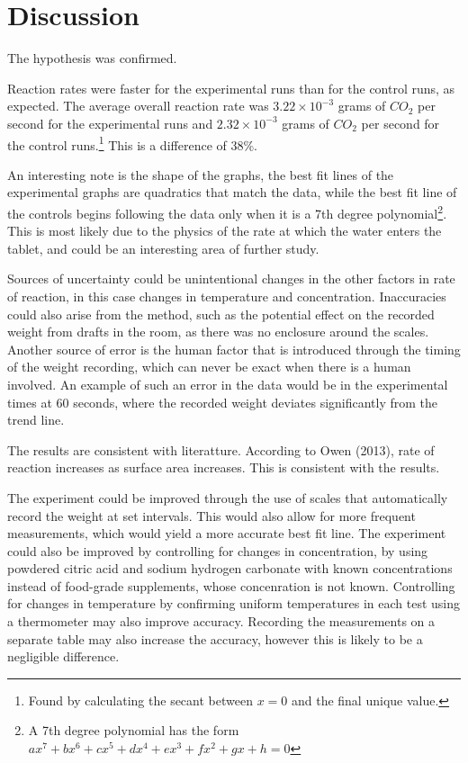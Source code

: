 \documentclass[twoside]{article}
\begin{document}
\section*{Discussion}
	The hypothesis was confirmed.

	Reaction rates were faster for the experimental runs than for the control runs, as expected. The average overall reaction rate was $3.22 \times 10^{-3}$ grams of $CO_2$ per second for the experimental runs and $2.32 \times 10^{-3}$ grams of $CO_2$ per second for the control runs.\footnote{Found by calculating the secant between $x=0$ and the final unique value.} This is a difference of 38\%.
	
	An interesting note is the shape of the graphs, the best fit lines of the experimental graphs are quadratics that match the data, while the best fit line of the controls begins following the data only when it is a 7th degree polynomial\footnote{A 7th degree polynomial has the form $ax^{7}+bx^{6}+cx^{5}+dx^{4}+ex^{3}+fx^{2}+gx+h=0$}. This is most likely due to the physics of the rate at which the water enters the tablet, and could be an interesting area of further study.

	Sources of uncertainty could be unintentional changes in the other factors in rate of reaction, in this case changes in temperature and concentration. Inaccuracies could also arise from the method, such as the potential effect on the recorded weight from drafts in the room, as there was no enclosure around the scales. Another source of error is the human factor that is introduced through the timing of the weight recording, which can never be exact when there is a human involved. An example of such an error in the data would be in the experimental times at 60 seconds, where the recorded weight deviates significantly from the trend line.

	The results are consistent with literatture. According to Owen (2013), rate of reaction increases as surface area increases. This is consistent with the results.

	The experiment could be improved through the use of scales that automatically record the weight at set intervals. This would also allow for more frequent measurements, which would yield a more accurate best fit line. The experiment could also be improved by controlling for changes in concentration, by using powdered citric acid and sodium hydrogen carbonate with known concentrations instead of food-grade supplements, whose concenration is not known. Controlling for changes in temperature by confirming uniform temperatures in each test using a thermometer may also improve accuracy. Recording the measurements on a separate table may also increase the accuracy, however this is likely to be a negligible difference.
\end{document}
